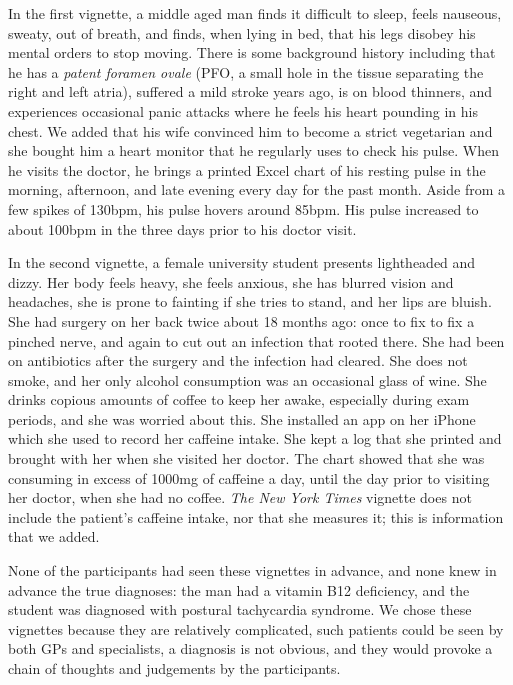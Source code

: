 \documentclass{sigchi}
\begin{document}
In the first vignette, a middle aged man finds it difficult to sleep, feels nauseous, sweaty, out of breath, and finds, when lying in bed, that his legs disobey his mental orders to stop moving.   There is some background history including that he has a \emph{patent foramen ovale} (PFO, a small hole in the tissue separating the right and left atria), suffered a mild stroke years ago, is on blood thinners, and experiences occasional panic attacks where he feels his heart pounding in his chest.  We added that his wife convinced him to become a strict vegetarian and she bought him a heart monitor that he regularly uses to check his pulse. When he visits the doctor, he brings a printed Excel chart of his resting pulse in the morning, afternoon, and late evening every day for the past month. Aside from a few spikes of 130bpm, his pulse hovers around 85bpm.  His pulse increased to about 100bpm in the three days prior to his doctor visit.  %

In the second vignette, a female university student presents lightheaded and dizzy. Her body feels heavy, she feels anxious, she has blurred vision and headaches, she is prone to fainting if she tries to stand, and her lips are bluish. She had surgery on her back twice about 18 months ago: once to fix to fix a pinched nerve, and again to cut out an infection that rooted there.  She had been on antibiotics after the surgery and the infection had cleared.  She does not smoke, and her only alcohol consumption was an occasional glass of wine.  She drinks copious amounts of coffee to keep her awake, especially during exam periods, and she was worried about this.  She installed an app on her iPhone which she used to record her caffeine intake. She kept a log that she printed and brought with her when she visited her doctor. The chart showed that she was consuming in excess of 1000mg of caffeine a day, until the day prior to visiting her doctor, when she had no coffee.  \emph{The New York Times} vignette does not include the patient's caffeine intake, nor that she measures it; this is information that we added.

None of the participants had seen these vignettes in advance, and none knew in advance the true diagnoses: the man had a vitamin B12 deficiency, and the student was diagnosed with postural tachycardia syndrome.  We chose these vignettes because they are relatively complicated, such patients could be seen by both GPs and specialists, a diagnosis is not obvious, and they would provoke a chain of thoughts and judgements by the participants.
\end{document}
